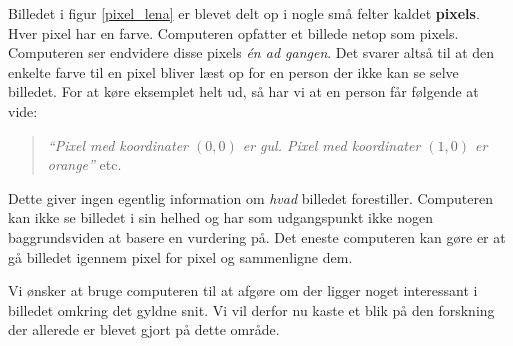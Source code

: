 {Billedet i figur \ref{pixel_lena} er blevet delt op i nogle små felter
kaldet \textbf{pixels}. Hver pixel har en farve. Computeren opfatter et billede
netop som pixels. Computeren ser endvidere disse pixels \emph{én ad
gangen}. Det svarer altså til at den enkelte farve til en pixel bliver
læst op for en person der ikke kan se selve billedet. For at køre
eksemplet helt ud, så har vi at en person får følgende at vide:
\begin{quote}
    \emph{``Pixel med koordinater $(0, 0)$ er gul. Pixel med
    koordinater $(1, 0)$ er orange''} etc.
\end{quote}
Dette giver ingen egentlig information om \emph{hvad} billedet
forestiller. Computeren kan ikke se billedet i sin helhed og har som
udgangspunkt ikke nogen baggrundsviden at basere en vurdering på. Det
eneste computeren kan gøre er at gå billedet igennem pixel for pixel og
sammenligne dem.

Vi ønsker at bruge computeren til at afgøre om der ligger noget
interessant i billedet omkring det gyldne snit. Vi vil derfor nu kaste
et blik på den forskning der allerede er blevet gjort på dette område.

}

